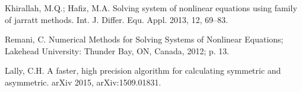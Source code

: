 \documentclass[11pt,a4paper]{article}
\begin{document}
\begin{thebibliography}{99}
 Khirallah, M.Q.; Hafiz, M.A. Solving system of nonlinear equations using family of jarratt methods. Int. J. Differ. Equ. Appl. 2013, 12, 69–83.

 Remani, C. Numerical Methods for Solving Systems of Nonlinear Equations; Lakehead University: Thunder Bay, ON, Canada, 2012; p. 13.

 Lally, C.H. A faster, high precision algorithm for calculating symmetric and asymmetric. arXiv 2015, arXiv:1509.01831.

\end{thebibliography}
\end{document}
